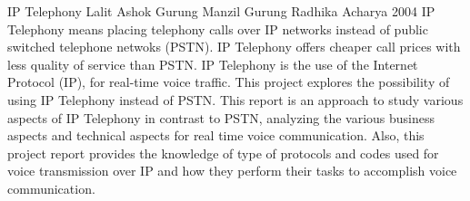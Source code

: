 \begin{conf-abstract}[]
{IP Telephony}
{ 
Lalit Ashok Gurung
Manzil Gurung
Radhika Acharya
}
{2004}
IP Telephony means placing telephony calls over IP networks instead of public switched telephone netwoks (PSTN). IP Telephony offers cheaper call prices with less quality of service than PSTN. IP Telephony is the use of the Internet Protocol (IP), for real-time voice traffic. This project explores the possibility of using IP Telephony instead of PSTN. This report is an approach to study various aspects of IP Telephony in contrast to PSTN, analyzing the various business aspects and technical aspects for real time voice communication. Also, this project report provides the knowledge of type of protocols and codes used for voice transmission over IP and how they perform their tasks to accomplish voice communication.
\end{conf-abstract}	
